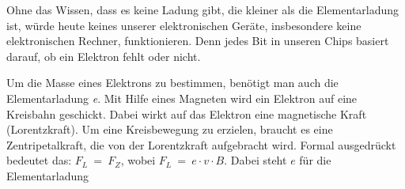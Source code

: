 Ohne das Wissen, dass es keine Ladung gibt, die kleiner als die Elementarladung ist, würde heute keines unserer elektronischen Geräte, insbesondere keine elektronischen Rechner, funktionieren. Denn jedes Bit in unseren Chips basiert darauf, ob ein Elektron fehlt oder nicht.

Um die Masse eines Elektrons zu bestimmen, benötigt man auch die Elementarladung \textit{e}. Mit Hilfe eines Magneten wird ein Elektron auf eine Kreisbahn geschickt. Dabei wirkt auf das Elektron eine magnetische Kraft (Lorentzkraft). Um eine Kreisbewegung zu erzielen, braucht es eine Zentripetalkraft, die von der Lorentzkraft aufgebracht wird. Formal ausgedrückt bedeutet das: $F_L \ = \ F_Z$, wobei $F_L \ = \ e \cdot v \cdot B$. Dabei steht $e$ für die Elementarladung

   
